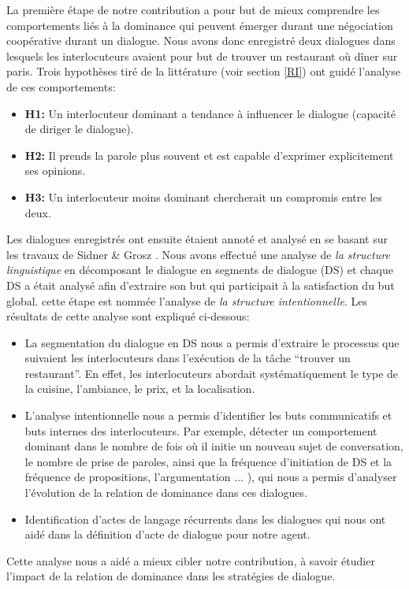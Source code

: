 \documentclass [french]{sig-alternate-05-2015}
\begin{document}
La première étape de notre contribution a pour but de mieux comprendre les comportements liés à la dominance qui peuvent émerger durant une négociation coopérative durant un dialogue. Nous avons donc enregistré deux dialogues dans lesquels les interlocuteurs avaient pour but de trouver un restaurant où dîner sur paris. Trois hypothèses tiré de la littérature (voir section \ref{RI}) ont guidé l'analyse de ces comportements: 
\begin{itemize}
\item \textbf{H1:} Un interlocuteur dominant a tendance à influencer le dialogue (capacité de diriger le dialogue).
\item \textbf{H2:} Il prends la parole plus souvent et est capable d'exprimer explicitement ses opinions.
\item \textbf{H3:} Un interlocuteur moins dominant chercherait un compromis entre les deux. 
\end{itemize}
 Les dialogues enregistrés ont ensuite étaient annoté et analysé en se basant sur les travaux de Sidner \& Grosz \cite{grosz1986attention}. Nous avons effectué une analyse de \textit{la structure linguistique}  en décomposant le dialogue en segments de dialogue (DS)  et chaque DS a était analysé afin d'extraire son but qui participait à la satisfaction du but global. cette étape est nommée l'analyse de \textit{la structure intentionnelle}. Les résultats de cette analyse sont expliqué ci-dessous: 

\begin{itemize}

		\item  La segmentation du dialogue en DS nous a permis d'extraire le processus que suivaient les interlocuteurs dans l'exécution de la tâche  ``trouver un restaurant''. En effet, les interlocuteurs abordait systématiquement le type de la cuisine, l'ambiance, le prix, et la localisation. 
		\item L'analyse intentionnelle nous a permis d'identifier les buts communicatifs et buts internes des interlocuteurs. Par exemple, détecter un comportement dominant dans le nombre de fois où il initie un nouveau sujet de conversation, le nombre de prise de paroles, ainsi que la fréquence d'initiation de DS et la fréquence de propositions, l'argumentation ... ), qui nous a permis d'analyser l'évolution de la relation de dominance dans ces dialogues. 
		\item Identification d'actes de langage récurrents dans les dialogues qui nous ont aidé dans la définition d'acte de dialogue pour notre agent.	
	
\end{itemize}
\par Cette analyse nous a aidé a mieux cibler notre contribution, à savoir étudier l'impact de la relation de dominance dans les stratégies de dialogue.
\end{document}
